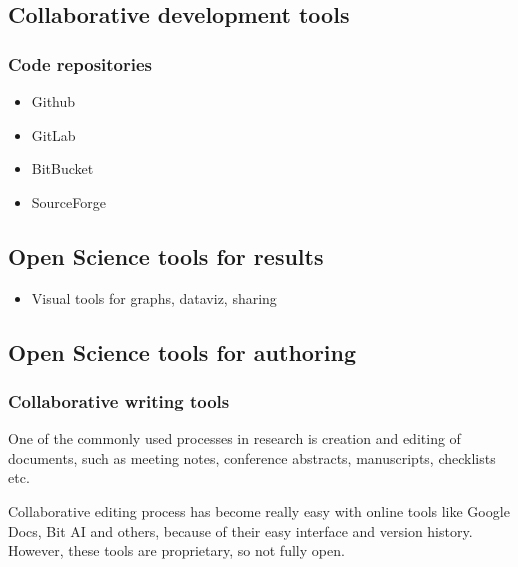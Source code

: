 \documentclass[
  letterpaper,
  DIV=11,
  numbers=noendperiod]{scrreport}
\providecommand{\tightlist}{%
  \setlength{\itemsep}{0pt}\setlength{\parskip}{0pt}}\usepackage{longtable,booktabs,array}
\begin{document}
\hypertarget{collaborative-development-tools}{%
\subsection{Collaborative development
tools}\label{collaborative-development-tools}}

\hypertarget{code-repositories}{%
\subsubsection{Code repositories}\label{code-repositories}}

\begin{itemize}
\tightlist
\item
  Github
\item
  GitLab
\item
  BitBucket
\item
  SourceForge
\end{itemize}

\hypertarget{open-science-tools-for-results}{%
\subsection{Open Science tools for
results}\label{open-science-tools-for-results}}

\begin{itemize}
\tightlist
\item
  Visual tools for graphs, dataviz, sharing
\end{itemize}

\hypertarget{open-science-tools-for-authoring}{%
\subsection{Open Science tools for
authoring}\label{open-science-tools-for-authoring}}

\hypertarget{collaborative-writing-tools}{%
\subsubsection{Collaborative writing
tools}\label{collaborative-writing-tools}}

One of the commonly used processes in research is creation and editing
of documents, such as meeting notes, conference abstracts, manuscripts,
checklists etc.

Collaborative editing process has become really easy with online tools
like Google Docs, Bit AI and others, because of their easy interface and
version history. However, these tools are proprietary, so not fully
open.
\end{document}
